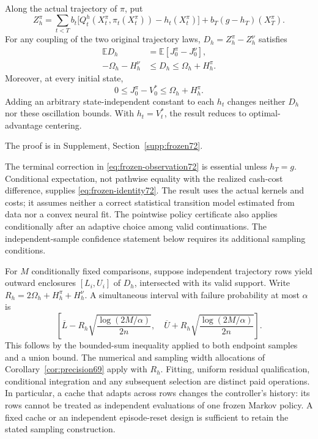 \begin{theorem}\label{thm:frozen72}
Along the actual trajectory of $\pi$, put
\begin{equation}\label{eq:frozen-observation72}
 Z_h^\pi=\sum_{t<T}b_t\bigl[Q_t^h(X_t^\pi,\pi_t(X_t^\pi))-h_t(X_t^\pi)\bigr]
                 +b_T(g-h_T)(X_T^\pi).
\end{equation}
For any coupling of the two original trajectory laws, $D_h=Z_h^\pi-Z_h^\nu$ satisfies
\begin{align}
 \mathbb E D_h&=\mathbb E[J_0^\pi-J_0^\nu],\label{eq:frozen-identity72}\\
 -\Omega_h-H_h^\nu&\le D_h\le\Omega_h+H_h^\pi.\label{eq:frozen-range72}
\end{align}
Moreover, at every initial state,
\begin{equation}\label{eq:frozen-regret72}
 0\le J_0^\pi-V_0^*\le\Omega_h+H_h^\pi.
\end{equation}
Adding an arbitrary state-independent constant to each $h_t$ changes neither $D_h$ nor these oscillation bounds. With $h_t=V_t^*$, the result reduces to optimal-advantage centering.
\end{theorem}
\noindent The proof is in Supplement, Section~\ref{supp:frozen72}.

The terminal correction in \eqref{eq:frozen-observation72} is essential unless $h_T=g$. Conditional expectation, not pathwise equality with the realized cash-cost difference, supplies \eqref{eq:frozen-identity72}. The result uses the actual kernels and costs; it assumes neither a correct statistical transition model estimated from data nor a convex neural fit. The pointwise policy certificate also applies conditionally after an adaptive choice among valid continuations. The independent-sample confidence statement below requires its additional sampling conditions.

For $M$ conditionally fixed comparisons, suppose independent trajectory rows yield outward enclosures $[L_i,U_i]$ of $D_h$, intersected with its valid support. Write $R_h=2\Omega_h+H_h^\pi+H_h^\nu$. A simultaneous interval with failure probability at most $\alpha$ is
\begin{equation}\label{eq:frozen-ci72}
 \left[\overline L-R_h\sqrt{\frac{\log(2M/\alpha)}{2n}},\quad
       \overline U+R_h\sqrt{\frac{\log(2M/\alpha)}{2n}}\right].
\end{equation}
This follows by the bounded-sum inequality applied to both endpoint samples and a union bound. The numerical and sampling width allocations of Corollary~\ref{cor:precision69} apply with $R_h$. Fitting, uniform residual qualification, conditional integration and any subsequent selection are distinct paid operations. In particular, a cache that adapts across rows changes the controller's history: its rows cannot be treated as independent evaluations of one frozen Markov policy. A fixed cache or an independent episode-reset design is sufficient to retain the stated sampling construction.

